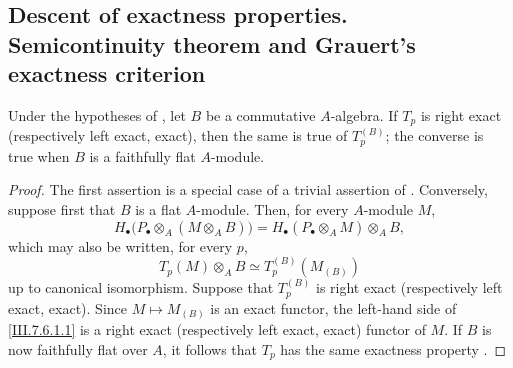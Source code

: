 \subsection{Descent of exactness properties. Semicontinuity theorem and
Grauert's exactness criterion}
\label{subsection:III.7.6}
\label{III.7.6}

\begin{proposition}[7.6.1]
\label{III.7.6.1}
Under the hypotheses of , let $B$ be a
commutative $A$-algebra.  If $T_p$ is right exact
(respectively left exact, exact), then the same is true of
$T_p^{(B)}$; the converse is true when $B$ is a faithfully
flat $A$-module.
\end{proposition}

\begin{proof}
The first assertion is a special case of a trivial assertion
of .  Conversely, suppose first that $B$ is a
flat $A$-module.  Then, for every $A$-module $M$,
\[
  H_\bullet\bigl(P_\bullet\otimes_A(M\otimes_A B)\bigr)
  =
  H_\bullet(P_\bullet\otimes_A M)\otimes_A B,
\]
which may also be written, for every $p$,
\[
  T_p(M)\otimes_A B
  \simeq
  T_p^{(B)}(M_{(B)})
  \tag{7.6.1.1}\label{III.7.6.1.1}
\]
up to canonical isomorphism.  Suppose that $T_p^{(B)}$ is
right exact (respectively left exact, exact).  Since
$M\mapsto M_{(B)}$ is an exact functor, the left-hand side of
\eqref{III.7.6.1.1} is a right exact (respectively left exact,
exact) functor of $M$.  If $B$ is now faithfully flat over
$A$, it follows that $T_p$ has the same exactness property
.
\end{proof}

